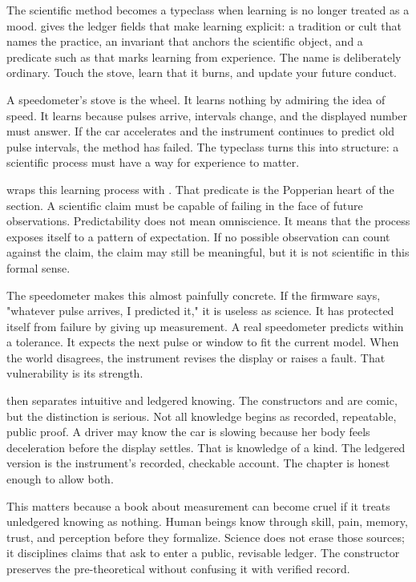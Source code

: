 The scientific method becomes a typeclass when learning is no longer treated as
a mood.  gives the ledger fields that make learning
explicit: a tradition or cult that names the practice, an invariant that
anchors the scientific object, and a predicate such as  that
marks learning from experience. The name is deliberately ordinary. Touch the
stove, learn that it burns, and update your future conduct.

A speedometer's stove is the wheel. It learns nothing by admiring the idea of
speed. It learns because pulses arrive, intervals change, and the displayed
number must answer. If the car accelerates and the instrument continues to
predict old pulse intervals, the method has failed. The typeclass turns this
into structure: a scientific process must have a way for experience to matter.

 wraps this learning process with . That
predicate is the Popperian heart of the section. A scientific claim must be
capable of failing in the face of future observations. Predictability does not
mean omniscience. It means that the process exposes itself to a pattern of
expectation. If no possible observation can count against the claim, the claim
may still be meaningful, but it is not scientific in this formal sense.

The speedometer makes this almost painfully concrete. If the firmware says,
"whatever pulse arrives, I predicted it," it is useless as science. It has
protected itself from failure by giving up measurement. A real speedometer
predicts within a tolerance. It expects the next pulse or window to fit the
current model. When the world disagrees, the instrument revises the display or
raises a fault. That vulnerability is its strength.

 then separates intuitive and ledgered knowing. The
constructors  and  are comic, but the distinction is
serious. Not all knowledge begins as recorded, repeatable, public proof. A
driver may know the car is slowing because her body feels deceleration before
the display settles. That is knowledge of a kind. The ledgered version is the
instrument's recorded, checkable account. The chapter is honest enough to allow
both.

This matters because a book about measurement can become cruel if it treats
unledgered knowing as nothing. Human beings know through skill, pain, memory,
trust, and perception before they formalize. Science does not erase those
sources; it disciplines claims that ask to enter a public, revisable ledger.
The  constructor preserves the pre-theoretical without confusing
it with verified record.

